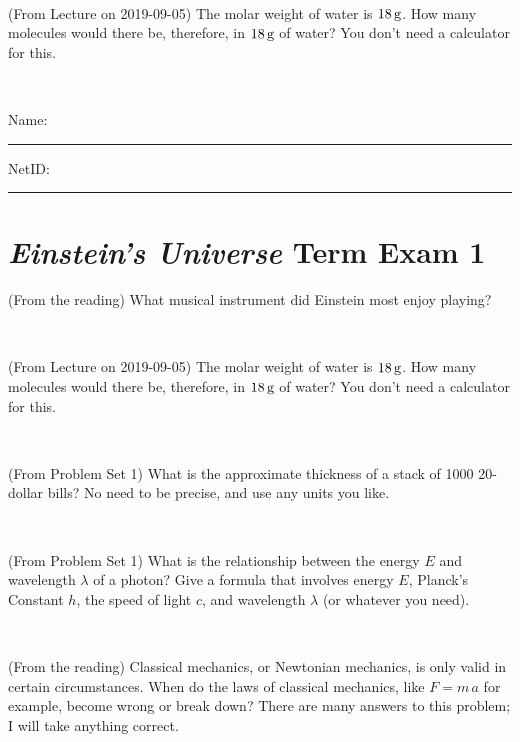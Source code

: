 \documentclass[12pt, letterpaper]{article}
\begin{document}
\vfill ~

\begin{problem} (From Lecture on 2019-09-05)
The molar weight of water is $18\,\mathrm{g}$. How many molecules would there
be, therefore, in $18\,\mathrm{g}$ of water? You don't need a calculator for
this.
\end{problem}


\vfill ~


\cleardoublepage



\noindent
Name: \rule[-1ex]{0.60\textwidth}{0.1pt}
NetID: \rule[-1ex]{0.20\textwidth}{0.1pt}

\section*{\textsl{Einstein's Universe} Term Exam 1}
\setcounter{problem}{1}


\begin{problem} (From the reading)
What musical instrument did Einstein most enjoy playing?
\end{problem}


\vfill ~

\begin{problem} (From Lecture on 2019-09-05)
The molar weight of water is $18\,\mathrm{g}$. How many molecules would there
be, therefore, in $18\,\mathrm{g}$ of water? You don't need a calculator for
this.
\end{problem}


\vfill ~

\begin{problem} (From Problem Set 1)
What is the approximate thickness of a stack of 1000 20-dollar bills?
No need to be precise, and use any units you like.
\end{problem}


\vfill ~

\begin{problem} (From Problem Set 1)
What is the relationship between the energy $E$ and wavelength
$\lambda$ of a photon? Give a formula that involves energy $E$,
Planck's Constant $h$, the speed of light $c$, and wavelength
$\lambda$ (or whatever you need).
\end{problem}

\vfill ~


\clearpage


\begin{problem} (From the reading)
Classical mechanics, or Newtonian mechanics, is only valid in certain
circumstances. When do the laws of classical mechanics, like $F =
m\,a$ for example, become wrong or break down? There are many answers
to this problem; I will take anything correct.
\end{problem}
\end{document}
